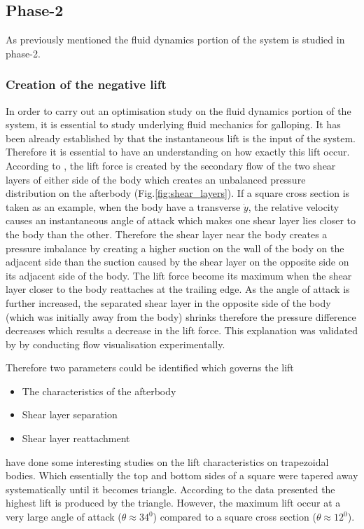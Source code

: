 \documentclass{article}
\begin{document}
\subsection{Phase-2}

As previously mentioned the fluid dynamics portion of the system is studied in phase-2.

\subsubsection{Creation of the negative lift}




In order to carry out an optimisation study on the fluid dynamics portion of the system, it is essential to study underlying fluid mechanics for galloping. It has been already established by \cite{Parkinson1964} that the instantaneous lift is the input of the system. Therefore it is essential to have an understanding on how exactly this lift occur. According to \cite{Parkinson1989},\cite{Luo1994} the lift force is created by the secondary flow of the two shear layers of either side of the body which creates an unbalanced pressure distribution on the afterbody (Fig.\ref{fig:shear_layers}). If a square cross section is taken as an example, when the body have a transverse $\dot{y}$, the relative velocity causes an instantaneous angle of attack which makes one shear layer lies closer to the body than the other. Therefore the shear layer near the body creates a pressure imbalance by creating a higher suction on the wall of the body on the adjacent side than the suction caused by the shear layer on the opposite side on its adjacent side of the body. The lift force become its maximum when the shear layer closer to the body reattaches at the trailing edge. As the angle of attack is further increased, the separated shear layer in the opposite side of the body (which was initially away from the body) shrinks therefore the pressure difference decreases which results a decrease in the lift force. This explanation was validated by \cite{Luo1994} by conducting flow visualisation experimentally.

Therefore two parameters could be identified which governs the lift 

\begin{itemize}
\item The characteristics of the afterbody
\item Shear layer separation
\item Shear layer reattachment 

\end{itemize}
\cite{Luo1994} have done some interesting studies on the lift characteristics on trapezoidal bodies. Which essentially the top and bottom sides of a square were tapered away systematically until it becomes triangle. According to the data presented \cite{Luo1994} the highest lift is produced by the triangle. However, the maximum lift occur at a very large angle of attack ($\theta\approx 34^0 $) compared to a square cross section ($\theta\approx 12^0 $).
\end{document}

